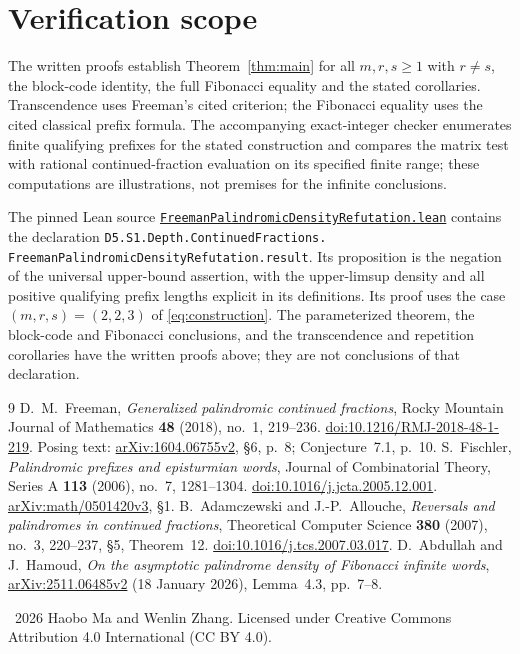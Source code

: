 \documentclass[11pt]{article}
\begin{document}
\section{Verification scope}
The written proofs establish Theorem~\ref{thm:main} for all $m,r,s\geq1$
with $r\ne s$, the block-code identity, the full Fibonacci equality and
the stated corollaries. Transcendence uses Freeman's cited criterion;
the Fibonacci equality uses the cited classical prefix formula.
The accompanying exact-integer checker
enumerates finite qualifying prefixes for the stated construction and compares
the matrix test with rational continued-fraction evaluation on its specified
finite range; these computations are illustrations, not premises for the
infinite conclusions.

The pinned Lean source
\href{https://github.com/the-omega-institute/trureturing/blob/aec68a61276de81e1e122880cd5921bac6e8f070/D5/S1/Depth/ContinuedFractions/FreemanPalindromicDensityRefutation.lean}{\texttt{FreemanPalindromicDensityRefutation.lean}}
contains the declaration
\texttt{D5.S1.Depth.ContinuedFractions.}\allowbreak
\texttt{FreemanPalindromicDensityRefutation.result}.
Its proposition is the negation of the universal upper-bound assertion,
with the upper-limsup density and all positive qualifying prefix lengths
explicit in its definitions. Its proof uses the case $(m,r,s)=(2,2,3)$ of
\eqref{eq:construction}. The parameterized theorem, the block-code and
Fibonacci conclusions, and the transcendence and repetition corollaries
have the written proofs above; they are not conclusions of that declaration.

\begin{thebibliography}{9}
 D.~M.~Freeman,
\emph{Generalized palindromic continued fractions},
Rocky Mountain Journal of Mathematics \textbf{48} (2018), no.~1, 219--236.
\href{https://doi.org/10.1216/RMJ-2018-48-1-219}{doi:10.1216/RMJ-2018-48-1-219}.
Posing text: \href{https://arxiv.org/abs/1604.06755v2}{arXiv:1604.06755v2},
\S6, p.~8; Conjecture~7.1, p.~10.
 S.~Fischler,
\emph{Palindromic prefixes and episturmian words},
Journal of Combinatorial Theory, Series A \textbf{113} (2006), no.~7,
1281--1304.
\href{https://doi.org/10.1016/j.jcta.2005.12.001}{doi:10.1016/j.jcta.2005.12.001}.
\href{https://arxiv.org/abs/math/0501420v3}{arXiv:math/0501420v3}, \S1.
 B.~Adamczewski and J.-P.~Allouche,
\emph{Reversals and palindromes in continued fractions},
Theoretical Computer Science \textbf{380} (2007), no.~3, 220--237,
\S5, Theorem~12.
\href{https://doi.org/10.1016/j.tcs.2007.03.017}{doi:10.1016/j.tcs.2007.03.017}.
 D.~Abdullah and J.~Hamoud,
\emph{On the asymptotic palindrome density of Fibonacci infinite words},
\href{https://arxiv.org/abs/2511.06485v2}{arXiv:2511.06485v2}
(18 January 2026), Lemma~4.3, pp.~7--8.
\end{thebibliography}
\medskip\noindent\footnotesize
\textcopyright\ 2026 Haobo Ma and Wenlin Zhang.
Licensed under Creative Commons Attribution 4.0 International (CC BY 4.0).
\end{document}
